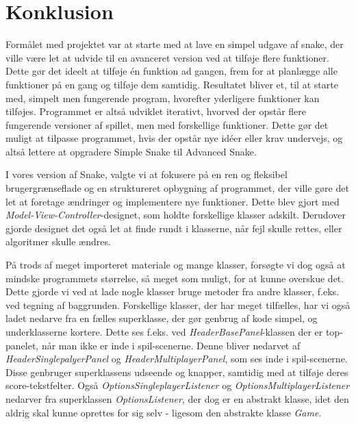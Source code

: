 \chapter{Konklusion}

Formålet med projektet var at starte med at lave en simpel udgave af snake, der ville være let at udvide til en avanceret version ved at tilføje flere funktioner. Dette gør det ideelt at tilføje én funktion ad gangen, frem for at planlægge alle funktioner på en gang og tilføje dem samtidig. Resultatet bliver et, til at starte med, simpelt men fungerende program, hvorefter yderligere funktioner kan tilføjes. Programmet er altså udviklet iterativt, hvorved der opstår flere fungerende versioner af spillet, men med forskellige funktioner. Dette gør det muligt at tilpasse programmet, hvis der opstår nye idéer eller krav undervejs, og altså lettere at opgradere Simple Snake til Advanced Snake.
\newline

I vores version af Snake, valgte vi at fokusere på en ren og fleksibel brugergrænseflade og en struktureret opbygning af programmet, der ville gøre det let at foretage ændringer og implementere nye funktioner. Dette blev gjort med \textit{Model-View-Controller}-designet, som holdte forskellige klasser adskilt. Derudover gjorde designet det også let at finde rundt i klasserne, når fejl skulle rettes, eller algoritmer skulle ændres.
\newline

På trods af meget importeret materiale og mange klasser, forsøgte vi dog også at mindske programmets størrelse, så meget som muligt, for at kunne overskue det. Dette gjorde vi ved at lade nogle klasser bruge metoder fra andre klasser, f.eks. ved tegning af baggrunden. Forskellige klasser, der har meget tilfælles, har vi også ladet nedarve fra en fælles superklasse, der gør genbrug af kode simpel, og underklasserne kortere. Dette ses f.eks. ved \textit{HeaderBasePanel}-klassen der er top-panelet, når man ikke er inde i spil-scenerne. Denne bliver nedarvet af \textit{HeaderSinglepalyerPanel} og \textit{HeaderMultiplayerPanel}, som ses inde i spil-scenerne. Disse genbruger superklassens udseende og knapper, samtidig med at tilføje deres score-tekstfelter. Også \textit{OptionsSingleplayerListener} og \textit{OptionsMultiplayerListener} nedarver fra superklassen \textit{OptionsListener}, der dog er en abstrakt klasse, idet den aldrig skal kunne oprettes for sig selv - ligesom den abstrakte klasse \textit{Game}.
\newline

